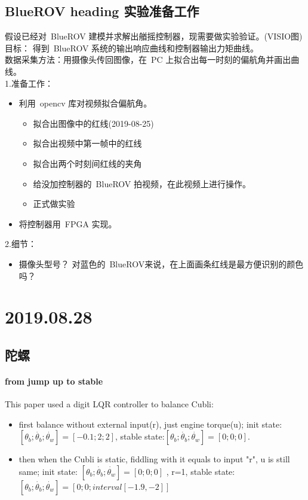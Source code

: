 \documentclass[UTF8,a4paper]{ctexart}
\begin{document}
\subsection{BlueROV heading 实验准备工作}
假设已经对~BlueROV 建模并求解出艏摇控制器，现需要做实验验证。(VISIO图)\\
目标： 得到~BlueROV 系统的输出响应曲线和控制器输出力矩曲线。\\
数据采集方法：用摄像头传回图像，在~PC 上拟合出每一时刻的偏航角并画出曲线。\\
1.准备工作：
\begin{itemize}
\item 利用~opencv 库对视频拟合偏航角。
\begin{itemize}
\item 拟合出图像中的红线(2019-08-25)
\item 拟合出视频中第一帧中的红线
\item 拟合出两个时刻间红线的夹角
\item 给没加控制器的~BlueROV 拍视频，在此视频上进行操作。
\item 正式做实验
\end{itemize}
\item 将控制器用~FPGA 实现。
\end{itemize}
2.细节：
\begin{itemize}
\item 摄像头型号？ 对蓝色的~BlueROV来说，在上面画条红线是最方便识别的颜色吗？
\end{itemize}
\section{2019.08.28}
\subsection{陀螺}
\paragraph{from jump up to stable}
This paper used a digit LQR controller to balance Cubli:
\begin{itemize}
\item first balance without external input(r), just engine torque(u); init state: $[\theta_b;\dot{\theta_b};\dot{\theta_w}]=[-0.1;2;2]$, stable state:$[\theta_b;\dot{\theta_b};\dot{\theta_w}]=[0;0;0]$.
\item then when the Cubli is static, fiddling with it equals to input "r", u is still same; init state: $[\theta_b;\dot{\theta_b};\dot{\theta_w}]=[0;0;0]$ , r=1, stable state:$[\theta_b;\dot{\theta_b};\dot{\theta_w}]=[0;0;interval[-1.9,-2] ]$
\end{itemize}
\end{document}
